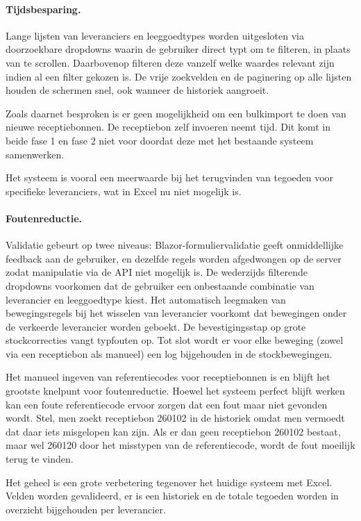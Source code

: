 \paragraph{Tijdsbesparing.} Lange lijsten van leveranciers en leeggoedtypes worden uitgesloten via doorzoekbare dropdowns waarin de gebruiker direct typt om te filteren, in plaats van te scrollen. Daarbovenop filteren deze vanzelf welke waardes relevant zijn indien al een filter gekozen is. De vrije zoekvelden en de paginering op alle lijsten houden de schermen snel, ook wanneer de historiek aangroeit. 

Zoals daarnet besproken is er geen mogelijkheid om een bulkimport te doen van nieuwe receptiebonnen. De receptiebon zelf invoeren neemt tijd. Dit komt in beide fase 1 en fase 2 niet voor doordat deze met het bestaande systeem samenwerken.

Het systeem is vooral een meerwaarde bij het terugvinden van tegoeden voor specifieke leveranciers, wat in Excel nu niet mogelijk is.

\paragraph{Foutenreductie.} Validatie gebeurt op twee niveaus: Blazor-formuliervalidatie geeft onmiddellijke feedback aan de gebruiker, en dezelfde regels worden afgedwongen op de server zodat manipulatie via de API niet mogelijk is. De wederzijds filterende dropdowns voorkomen dat de gebruiker een onbestaande combinatie van leverancier en leeggoedtype kiest. Het automatisch leegmaken van bewegingsregels bij het wisselen van leverancier voorkomt dat bewegingen onder de verkeerde leverancier worden geboekt. De bevestigingsstap op grote stockcorrecties vangt typfouten op. Tot slot wordt er voor elke beweging (zowel via een receptiebon als manueel) een log bijgehouden in de stockbewegingen.

Het manueel ingeven van referentiecodes voor receptiebonnen is en blijft het grootste knelpunt voor foutenreductie. Hoewel het systeem perfect blijft werken kan een foute referentiecode ervoor zorgen dat een fout maar niet gevonden wordt. Stel, men zoekt receptiebon 260102 in de historiek omdat men vermoedt dat daar iets misgelopen kan zijn. Als er dan geen receptiebon 260102 bestaat, maar wel 260120 door het misstypen van de referentiecode, wordt de fout moeilijk terug te vinden.

Het geheel is een grote verbetering tegenover het huidige systeem met Excel. Velden worden gevalideerd, er is een historiek en de totale tegoeden worden in overzicht bijgehouden per leverancier.  

